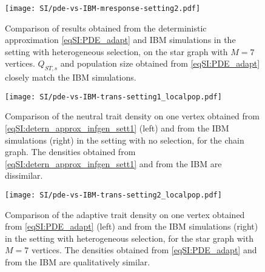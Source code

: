 \FloatBarrier

\begin{figure}[t]
  \centering
      \texttt{[image: SI/pde-vs-IBM-mresponse-setting2.pdf]}
    \caption{ Comparison of results obtained from the deterministic approximation \cref{eqSI:PDE_adapt} and IBM simulations in the setting with heterogeneous selection, on the star graph with $M=7$ vertices. $Q_{ST,s}$ and population size obtained from \cref{eqSI:PDE_adapt} closely match the IBM simulations.}
    \label{figSI:pde-vs-IBM-mresponse-setting2}
\end{figure}
\FloatBarrier





\begin{figure}[t]
  \centering
      \texttt{[image: SI/pde-vs-IBM-trans-setting1\_localpop.pdf]}
    \caption{ Comparison of the neutral trait density on one vertex obtained from \cref{eqSI:detern_approx_infgen_sett1} (left) and from the IBM simulations (right) in the setting with no selection, for the chain graph. The densities obtained from \cref{eqSI:detern_approx_infgen_sett1} and from the IBM are dissimilar.}
    \label{figSI:pde-vs-IBM-trans-setting1_localpop}
  \end{figure}
\FloatBarrier


\begin{figure}[t]
  \centerline{
      \texttt{[image: SI/pde-vs-IBM-trans-setting2\_localpop.pdf]}}
    \caption{ Comparison of the adaptive trait density on one vertex obtained from \cref{eqSI:PDE_adapt} (left) and from the IBM simulations (right) in the setting with heterogeneous selection, for the star graph with $M=7$ vertices. The densities obtained from \cref{eqSI:PDE_adapt} and from the IBM are qualitatively similar.}
    \label{figSI:pde-vs-IBM-trans-setting2_localpop}
\end{figure}
\FloatBarrier

